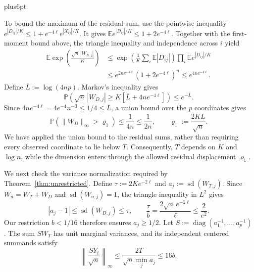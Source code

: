 \documentclass[11pt,letterpaper,twoside,leqno]{article}
\makeatletter
\theoremstyle{bookplain}
\theoremstyle{bookremark}
\renewenvironment{proof}[1][\proofname]{\par
  \pushQED{\qed}\normalfont\topsep6pt plus6pt\relax
  \trivlist\item[\hskip\labelsep\bfseries #1\@addpunct{.}]\ignorespaces
}{\popQED\endtrivlist\@endpefalse}
\newcommand{\E}{\mathbb E}
\newcommand{\Pp}{\mathbb P}
\makeatother
\begin{document}
\begin{proof}[Proof of Corollary~\ref{cor:subexponential}]
To bound the maximum of the residual sum, use the pointwise inequality
$e^{|D_{ij}|/K}\le1+e^{-4\ell}e^{|X_{ij}|/K}$.
It gives $\E e^{|D_{ij}|/K}\le1+2e^{-4\ell}$.
Together with the first-moment bound above, the triangle inequality
and independence across $i$ yield
\begin{align*}
 \E\exp\!\left(\frac{\sqrt n\,|W_{D,j}|}{K}\right)
 &\le\exp\!\left(\frac1K\sum_i\E|D_{ij}|\right)
          \prod_i\E e^{|D_{ij}|/K}\\
 &\le e^{2ne^{-4\ell}}(1+2e^{-4\ell})^n
 \le e^{4ne^{-4\ell}}.
\end{align*}
Define $\bar L:=\log(4np)$. Markov's inequality gives
\[
 \Pp\!\left(\sqrt n\,|W_{D,j}|\ge K[\bar L+4ne^{-4\ell}]\right)
 \le e^{-\bar L}.
\]
Since $4ne^{-4\ell}=4e^{-4}n^{-3}\le1/4\le\bar L$, a union
bound over the $p$ coordinates gives
\begin{equation}
 \Pp(\|W_D\|_\infty>\varrho_1)\le\frac1{4n}\le\frac1{2n},
 \qquad \varrho_1:=\frac{2K\bar L}{\sqrt n}.
 \label{tail:sum-coupling}
\end{equation}
We have applied the union bound to the residual sums, rather than
requiring every observed coordinate to lie below $T$.
Consequently, $T$ depends on $K$ and $\log n$, while the dimension
enters through the allowed residual displacement $\varrho_1$.

We next check the variance normalization required by
Theorem~\ref{thm:unrestricted}. Define
$\tau:=2Ke^{-2\ell}$ and $a_j:=\operatorname{sd}(W_{T,j})$.
Since $W_n=W_T+W_D$ and $\operatorname{sd}(W_{n,j})=1$, the
triangle inequality in $L^2$ gives
\[
 |a_j-1|\le\operatorname{sd}(W_{D,j})\le\tau,
 \qquad \frac\tau b=\frac{2\sqrt n\,e^{-2\ell}}\ell
 \le\frac2{e^2}.
\]
Our restriction $b<1/16$ therefore ensures $a_j\ge1/2$.
Let $S:=\operatorname{diag}(a_1^{-1},\ldots,a_p^{-1})$.
The sum $SW_T$ has unit marginal variances, and its independent
centered summands satisfy
\[
 \left\|\frac{SY_i}{\sqrt n}\right\|_\infty
 \le\frac{2T}{\sqrt n\min_j a_j}\le16b.
\]


\end{proof}
\end{document}
